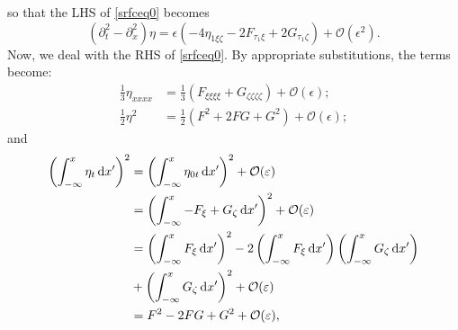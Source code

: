 so that the LHS of \eqref{srfceq0} becomes
\begin{equation}
(\partial_t^2 - \partial_x^2) \eta =  \epsilon \left(- 4\eta_{1\xi \zeta} - 2F_{\tau_1 \xi} + 2G_{\tau_1 \zeta} \right) + \mathcal{O}(\epsilon^2). \label{LHS1}
\end{equation}
Now, we deal with the RHS of \eqref{srfceq0}. By appropriate substitutions, the terms become:
\begin{align*}
\frac{1}{3}\eta_{xxxx} &= \frac{1}{3}(F_{\xi\xi\xi\xi} + G_{\zeta\zeta\zeta\zeta}) + \mathcal{O}(\epsilon); \\
\frac{1}{2}\eta^2 &= \frac{1}{2} (F^2 + 2FG +G^2) + \mathcal{O}(\epsilon);
\end{align*}
and 
\begin{align*}
\left( \int^{x}_{-\infty} \eta_t \,\mathrm{d} x' \right)^2 &= \left( \int^{x}_{-\infty} \eta_{0t} \,\mathrm{d} x' \right)^2 + \mathcal{O}(\varepsilon) \\
&= \left( \int^{x}_{-\infty}-F_\xi + G_\zeta \,\mathrm{d} x' \right)^2 + \mathcal{O}(\varepsilon)\\
&= \left( \int^{x}_{-\infty}F_\xi \,\mathrm{d} x'\right)^2 - 2\left( \int^{x}_{-\infty}F_\xi \,\mathrm{d} x'\right)\left( \int^{x}_{-\infty}G_\zeta \,\mathrm{d} x'\right) \\
&+ \left( \int^{x}_{-\infty} G_\zeta \,\mathrm{d} x'\right)^2 + \mathcal{O}(\varepsilon) \\
&= F^2 - 2FG + G^2 + \mathcal{O}(\varepsilon),
\end{align*}
